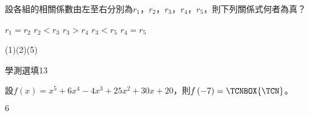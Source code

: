 \begin{QUESTIONS}
\begin{QUESTION}
\begin{QBODY}
            設各組的相關係數由左至右分別為${{r}_{1}}$，${{r}_{2}}$，${{r}_{3}}$，${{r}_{4}}$，${{r}_{5}}$，則下列關係式何者為真？
            \begin{QOPS}
                \QOP ${{r}_{1}}={{r}_{2}}$
                \QOP ${{r}_{2}}<{{r}_{3}}$
                \QOP ${{r}_{3}}>{{r}_{4}}$
                \QOP ${{r}_{3}}<{{r}_{5}}$
                \QOP ${{r}_{4}}={{r}_{5}}$
            \end{QOPS}
        \end{QBODY}
        \begin{QFROMS}
        \end{QFROMS}
        \begin{QTAGS}\end{QTAGS}
        \begin{QANS}
            (1)(2)(5)
        \end{QANS}
        \begin{QSOLLIST}
        \end{QSOLLIST}
        \begin{QEMPTYSPACE}
        \end{QEMPTYSPACE}
    \end{QUESTION}
\end{QUESTIONS}\begin{QUESTIONS}
    \begin{QUESTION}
        \begin{ExamInfo}{86}{學測}{選填}{13}
        \end{ExamInfo}
        \begin{ExamAnsRateInfo}{}{}{}{}
        \end{ExamAnsRateInfo}
        \begin{QBODY}
            設$f\left( x \right)={{x}^{5}}+6{{x}^{4}}-4{{x}^{3}}+25{{x}^{2}}+30x+20$，則$f\left( -7 \right)= \TCNBOX{\TCN}$。
        \end{QBODY}
        \begin{QFROMS}
        \end{QFROMS}
        \begin{QTAGS}\end{QTAGS}
        \begin{QANS}
            $6$
        \end{QANS}
        \begin{QSOLLIST}
        \end{QSOLLIST}
        \begin{QEMPTYSPACE}
        \end{QEMPTYSPACE}

\end{QUESTION}
\end{QUESTIONS}
